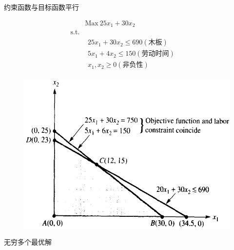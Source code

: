 \documentclass[mathserif, table]{beamer}
\begin{document}
\begin{frame}{约束函数与目标函数平行}
  \begin{figure}
    \begin{minipage}{.5\linewidth}
      \[ 
      \begin{array}{lcl}
        & \mbox{Max}\ 25x_1 + 30x_2 & \\
        \mbox{s.t.} & &  \\
        &
        \begin{array}{c}
          25x_1 + 30x_2 \le 690 (\text{木板})\\
          5x_1 + 4x_2 \le 150 (\text{劳动时间})\\
          x_1, x_2 \ge 0 (\text{非负性})
        \end{array}
        &
      \end{array}
      \]
    \end{minipage}%
    \begin{minipage}{.5\linewidth}
      \includegraphics[width=\textwidth{}]{coincide.png}
    \end{minipage}
  \end{figure}

  无穷多个最优解

\end{frame}
\end{document}
